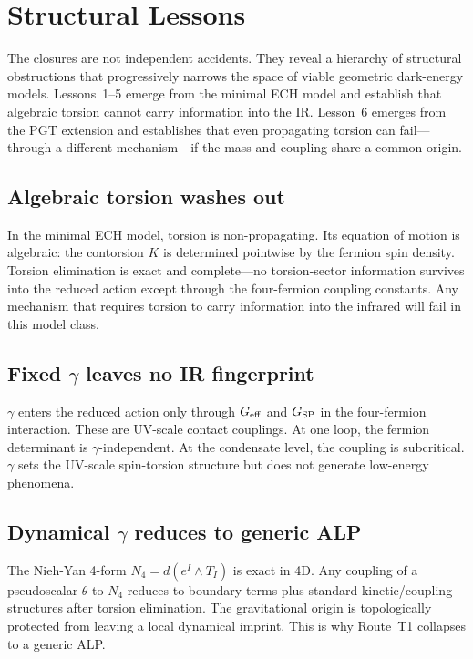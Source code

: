 \documentclass[aps,prd,twocolumn,superscriptaddress,showpacs,preprintnumbers,
  nofootinbib,longbibliography,floatfix]{revtex4-2}
\newcommand{\BI}{\gamma}
\newcommand{\Geff}{G_{\rm eff}}
\newcommand{\Gsp}{G_{\rm SP}}
\begin{document}
\section{Structural Lessons}\label{sec:lessons}

The closures are not independent accidents. They reveal a hierarchy of
structural obstructions that progressively narrows the space of viable
geometric dark-energy models. Lessons~1--5 emerge from the minimal ECH
model and establish that algebraic torsion cannot carry information into
the IR. Lesson~6 emerges from the PGT extension and establishes that
even propagating torsion can fail---through a different mechanism---if
the mass and coupling share a common origin.

\subsection{Algebraic torsion washes out}

In the minimal ECH model, torsion is non-propagating. Its equation of
motion is algebraic: the contorsion $K$ is determined pointwise by the
fermion spin density. Torsion elimination is exact and complete---no
torsion-sector information survives into the reduced action except
through the four-fermion coupling constants. Any mechanism that requires
torsion to carry information into the infrared will fail in this model
class.

\subsection{Fixed $\BI$ leaves no IR fingerprint}

$\BI$ enters the reduced action only through $\Geff$ and $\Gsp$ in the
four-fermion interaction. These are UV-scale contact couplings.
At one loop, the fermion determinant is $\BI$-independent.
At the condensate level, the coupling is subcritical.
$\BI$ sets the UV-scale spin-torsion structure but does not generate
low-energy phenomena.

\subsection{Dynamical $\BI$ reduces to generic ALP}

The Nieh-Yan 4-form $N_4 = d(e^I \wedge T_I)$ is exact in 4D. Any
coupling of a pseudoscalar $\theta$ to $N_4$ reduces to boundary terms
plus standard kinetic/coupling structures after torsion elimination.
The gravitational origin is topologically protected from leaving a local
dynamical imprint. This is why Route~T1 collapses to a generic ALP.
\end{document}
